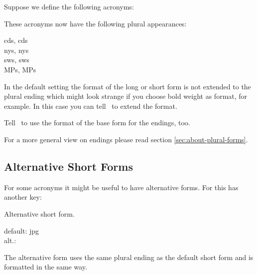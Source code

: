 \documentclass[load-preamble+]{cnltx-doc}
\begin{document}
Suppose we define the following acronyms:
\begin{sourcecode}
\end{sourcecode}
These acronyms now have the following plural appearances:
\begin{example}
  \acsp{cd}, \aclp{cd} \\
  \acsp{ny}, \aclp{ny} \\
  \acsp{sw}, \aclp{sw} \\
  \acsp{MP}, \aclp{MP}
\end{example}

In the default setting the format of the long or short form is not extended to
the plural ending which might look strange if you choose bold weight as
format, for example.  In this case you can tell \acro\ to extend the format.
\begin{options}
    Tell \acro\ to use the format of the base form for the
    endings, too.
\end{options}
For a more general view on endings please read section
\vref{sec:about-plural-forms}.

\subsection{Alternative Short Forms}
For some acronyms it might be useful to have alternative forms.  For this
 has another key:
\begin{options}
   Alternative short form.
\end{options}
\begin{example}
  default: \acs{jpg} \\
  alt.: 
\end{example}
The alternative form uses the same plural ending as the default short form and
is formatted in the same way.
\end{document}

